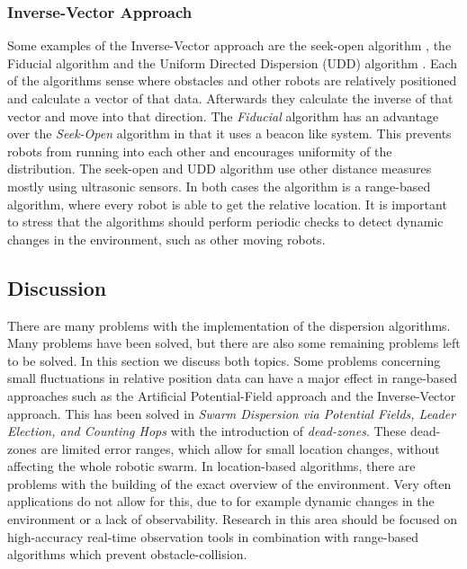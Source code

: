 \subsubsection{Inverse-Vector Approach}
Some examples of the Inverse-Vector approach are the seek-open algorithm \cite{morlok2007dispersing}, the Fiducial algorithm \cite{morlok2007dispersing} and the Uniform Directed Dispersion (UDD) algorithm \cite{mclurkin2007distributed}.
Each of the algorithms sense where obstacles and other robots are relatively positioned and calculate a vector of that data. 
Afterwards they calculate the inverse of that vector and move into that direction.
The \emph{Fiducial} algorithm has an advantage over the \emph{Seek-Open} algorithm in that it uses a beacon like system. 
This prevents robots from running into each other and encourages uniformity of the distribution.
The seek-open and UDD algorithm use other distance measures mostly using ultrasonic sensors. 
In both cases the algorithm is a range-based algorithm, where every robot is able to get the relative location. 
It is important to stress that the algorithms should perform periodic checks to detect dynamic changes in the environment, such as other moving robots.

\subsection{Discussion}
There are many problems with the implementation of the dispersion algorithms. 
Many problems have been solved, but there are also some remaining problems left to be solved. 
In this section we discuss both topics.
Some problems concerning small fluctuations in relative position data can have a major effect in range-based approaches such as the Artificial Potential-Field approach and the Inverse-Vector approach. 
This has been solved in \emph{Swarm Dispersion via Potential Fields, Leader Election, and Counting Hops} with the introduction of \emph{dead-zones}. 
These dead-zones are limited error ranges, which allow for small location changes, without affecting the whole robotic swarm.
In location-based algorithms, there are problems with the building of the exact overview of the environment. 
Very often applications do not allow for this, due to for example dynamic changes in the environment or a lack of observability. 
Research in this area should be focused on high-accuracy real-time observation tools in combination with range-based algorithms which prevent obstacle-collision. 

